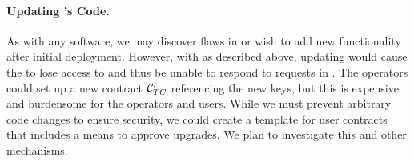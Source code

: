 \paragraph{Updating \tc's Code.}
As with any software, we may discover flaws in \tc or wish to add new functionality after initial deployment.
However, with \tc as described above, updating \engine would cause the \encname to lose access to \skTC and thus be unable to respond to requests in \tcont.
The \tc operators could set up a new contract $\tcont'$ referencing the new keys, but this is expensive and burdensome for the \tc operators and users.
While we must prevent arbitrary code changes to ensure security,
we could create a template for user contracts that includes a means to approve upgrades.
We plan to investigate this and other mechanisms.


